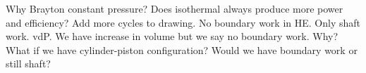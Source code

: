 \documentclass{article}
\begin{document}
	Why Brayton constant pressure?
	Does isothermal always produce more power and efficiency?
	Add more cycles to drawing.
	No boundary work in HE. Only shaft work. vdP. We have increase in volume but we say no boundary work. Why?
	What if we have cylinder-piston configuration? Would we have boundary work or still shaft?
\end{document}
